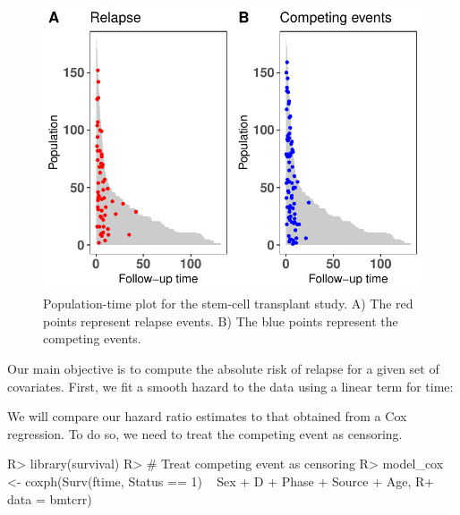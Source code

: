 \documentclass[
]{jss}
\begin{document}
\begin{CodeChunk}
\begin{figure}

{\centering \includegraphics{../figures/compPop-1} 

}

\caption[Population-time plot for the stem-cell transplant study]{Population-time plot for the stem-cell transplant study. A) The red points represent relapse events. B) The blue points represent the competing events.}\label{fig:compPop}
\end{figure}
\end{CodeChunk}

Our main objective is to compute the absolute risk of relapse for a
given set of covariates. First, we fit a smooth hazard to the data using
a linear term for time:

We will compare our hazard ratio estimates to that obtained from a Cox
regression. To do so, we need to treat the competing event as censoring.

\begin{CodeChunk}

\begin{CodeInput}
R> library(survival)
R> # Treat competing event as censoring
R> model_cox <- coxph(Surv(ftime, Status == 1) ~ Sex + D + Phase + Source + Age,
R+                    data = bmtcrr)
\end{CodeInput}
\end{CodeChunk}
\end{document}
